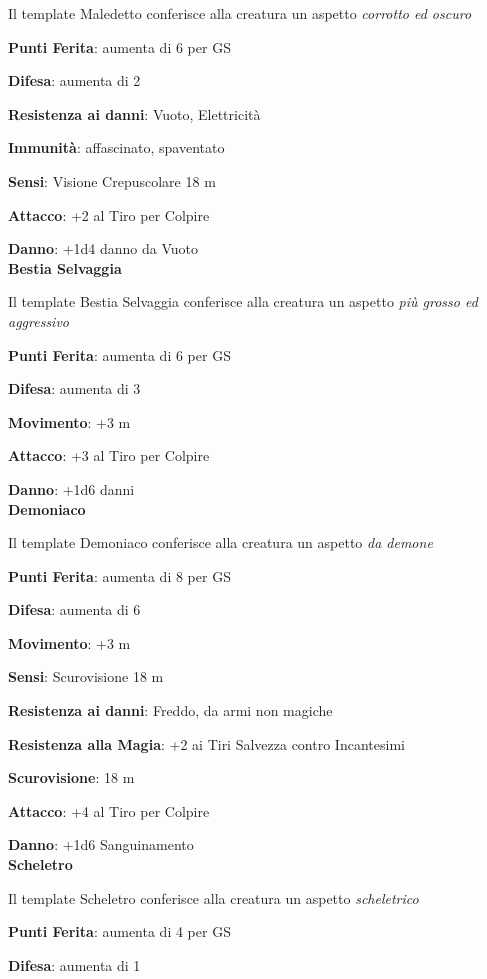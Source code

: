 \begin{multicols}{2}
Il template Maledetto conferisce alla creatura un aspetto \emph{corrotto ed oscuro}

\textbf{Punti Ferita}: aumenta di 6 per GS

\textbf{Difesa}: aumenta di 2

\textbf{Resistenza ai danni}: Vuoto, Elettricità

\textbf{Immunità}: affascinato, spaventato

\textbf{Sensi}: Visione Crepuscolare 18 m

\textbf{Attacco}: +2 al Tiro per Colpire

\textbf{Danno}: +1d4 danno da Vuoto\\

\textbf{Bestia Selvaggia}

Il template Bestia Selvaggia conferisce alla creatura un aspetto \emph{più grosso ed aggressivo}

\textbf{Punti Ferita}: aumenta di 6 per GS

\textbf{Difesa}: aumenta di 3

\textbf{Movimento}: +3 m

\textbf{Attacco}: +3 al Tiro per Colpire

\textbf{Danno}: +1d6 danni\\

\textbf{Demoniaco}

Il template Demoniaco conferisce alla creatura un aspetto \emph{da demone}

\textbf{Punti Ferita}: aumenta di 8 per GS

\textbf{Difesa}: aumenta di 6

\textbf{Movimento}: +3 m

\textbf{Sensi}: Scurovisione 18 m

\textbf{Resistenza ai danni}: Freddo, da armi non magiche

\textbf{Resistenza alla Magia}: +2 ai Tiri Salvezza contro Incantesimi

\textbf{Scurovisione}: 18 m

\textbf{Attacco}: +4 al Tiro per Colpire

\textbf{Danno}: +1d6 Sanguinamento\\

\textbf{Scheletro}

Il template Scheletro conferisce alla creatura un aspetto \emph{scheletrico}

\textbf{Punti Ferita}: aumenta di 4 per GS

\textbf{Difesa}: aumenta di 1


\end{multicols}
